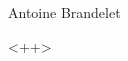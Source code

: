 \documentclass[12pt]{article}
\begin{document}
\begin{titlepage}
\centering 
\vspace*{7cm}
{\textcolor{Red}{\textbf{\Huge <++>}}}\\[\baselineskip]
{\Large \textit{}}\\[\baselineskip]
{\Large Antoine Brandelet}
\end{titlepage}

<++>
\end{document}
